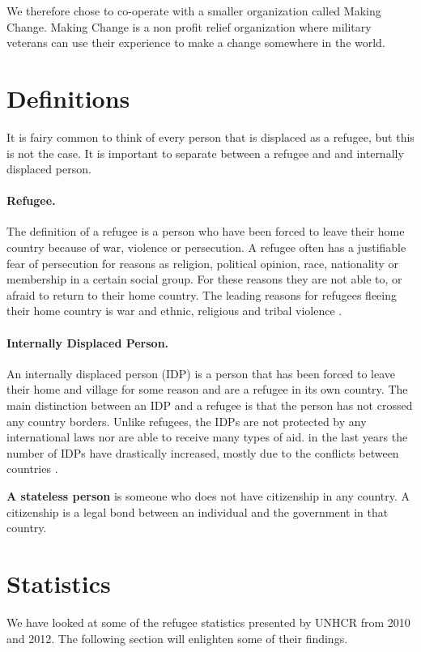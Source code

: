 We therefore chose to co-operate with a smaller organization called Making Change. Making Change is a non profit relief organization where military veterans can use their experience to make a change somewhere in the world.

\section{Definitions}
It is fairy common to think of every person that is displaced as a refugee, but this is not the case. It is important to separate between a refugee and and internally displaced person. 

\paragraph{Refugee.} The definition of a refugee is a person who have been forced to leave their home country because of war, violence or persecution. A refugee often has a justifiable fear of persecution for reasons as religion, political opinion, race, nationality or membership in a certain social group. For these reasons they are not able to, or
afraid to return to their home country. The leading reasons for refugees fleeing their home country is war and ethnic, religious and tribal violence \cite{refugeeDef}.

\paragraph{Internally Displaced Person.} An internally displaced person (IDP) is a person that has been forced to leave their home and village for some reason and are a refugee in its own country. The main distinction between an IDP and a refugee is that the person has not crossed any country borders. Unlike refugees, the IDPs are not protected by any international laws nor are able to receive many types of aid. in the last years the number of IDPs have drastically increased, mostly due to the conflicts between countries \cite{refugeeDef}. 

\textbf{A stateless person} is someone who does not have citizenship in any country. A citizenship is a legal bond between an individual and the government in that country. 

\section{Statistics}
We have looked at some of the refugee statistics presented by UNHCR from 2010 and 2012. The following section will enlighten some of their findings. 


